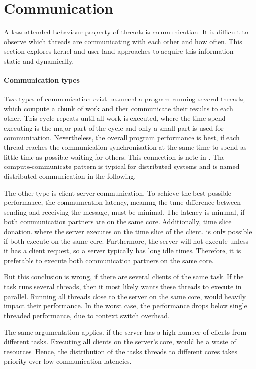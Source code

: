 \section{Communication}
\label{design:comm}

A less attended behaviour property of threads is communication.
It is difficult to observe which threads are communicating with each other and
how often.
This section explores kernel and user land approaches to acquire this
information static and dynamically.


\paragraph{Communication types}
Two types of communication exist.
\citeauthor{hofmeyr_load_2010} assumed a program running several threads, which
compute a chunk of work and then communicate their results to each other.
This cycle repeats until all work is executed, where the time spend executing
is the major part of the cycle and only a small part is used for communication.
Nevertheless, the overall program performance is best, if each thread reaches
the communication synchronisation at the same time to spend as little time as
possible waiting for others.
This connection is note in \cite{hofmeyr_load_2010}.
The compute-communicate pattern is typical for distributed systems and is named
distributed communication in the following.

The other type is client-server communication.
To achieve the best possible performance, the communication latency, meaning
the time difference between sending and receiving the message, must be minimal.
The latency is minimal, if both communication partners are on the same core.
Additionally, time slice donation, where the server executes on the time slice
of the client, is only possible if both execute on the same core.
Furthermore, the server will not execute unless it has a client request, so a
server typically has long idle times.
Therefore, it is preferable to execute both communication partners on the same
core.

But this conclusion is wrong, if there are several clients of the same task.
If the task runs several threads, then it most likely wants these threads to
execute in parallel.
Running all threads close to the server on the same core, would heavily impact
their performance.
In the worst case, the performance drops below single threaded performance, due
to context switch overhead.

The same argumentation applies, if the server has a high number of clients from
different tasks.
Executing all clients on the server's core, would be a waste of resources.
Hence, the distribution of the tasks threads to different cores takes priority
over low communication latencies.


